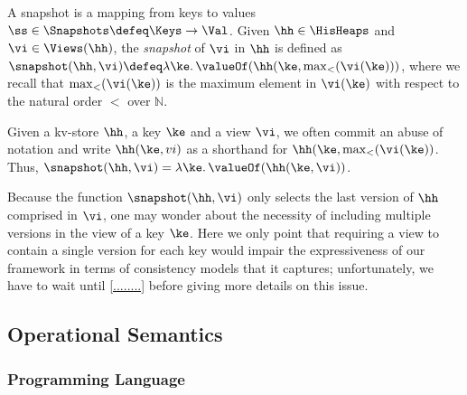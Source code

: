 \begin{definition}[Snapshots]
\label{def:heaps}
\label{def:snapshot}
A snapshot is a mapping from keys to values \( \ss \in \Snapshots  \defeq \Keys \to \Val\).
Given $\hh \in \HisHeaps$ and $\vi \in \Views(\hh)$, the \emph{snapshot} of $\vi$ in 
$\hh$ is defined as $\snapshot(\hh, \vi) \defeq \lambda \ke \ldotp \valueOf(\hh(\ke, \max_{<}(\vi(\ke)))$, 
where we recall that $\max_{<}(\vi(\ke))$ is the maximum element in $\vi(\ke)$ with respect to the natural 
order $<$ over $\mathbb{N}$.
\end{definition}
Given a kv-store $\hh$, a key $\ke$ and a view $\vi$, we often commit an abuse of notation and write 
$\hh(\ke, vi)$ as a shorthand for 
$\hh(\ke, \max_{<}(\vi(\ke))$. Thus, $\snapshot(\hh, \vi) = \lambda \ke \ldotp \valueOf(\hh(\ke, \vi))$. 

\begin{remark}
Because the function $\snapshot(\hh, \vi)$ only selects the last version of $\hh$ comprised 
in $\vi$, one may wonder about the necessity of including multiple versions in the view of a 
key $\ke$.  Here we only point that requiring a view to contain a single version for each key 
would impair the expressiveness of our framework in terms of consistency models that it captures; 
unfortunately, we have to wait until \cref{........} before giving more details on this issue.
\end{remark}


\subsection{Operational Semantics}

\subsubsection{Programming Language}

